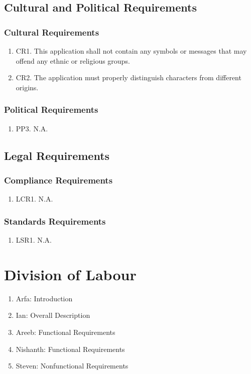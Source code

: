 \documentclass[]{article}
\begin{document}
\subsection{Cultural and Political Requirements}
\subsubsection{Cultural Requirements}
\begin{enumerate}
	\item CR1. This application shall not contain any symbols or messages that may offend any ethnic or religious groups.
	\item CR2. The application must properly distinguish characters from different origins.
\end{enumerate}

\subsubsection{Political Requirements}
\begin{enumerate}
	\item PP3. N.A.
\end{enumerate}

\subsection{Legal Requirements}
\subsubsection{Compliance Requirements}
\begin{enumerate}
	\item LCR1. N.A.
\end{enumerate}

\subsubsection{Standards Requirements}
\begin{enumerate}
	\item LSR1. N.A.
\end{enumerate}

\appendix
\section{Division of Labour}
\label{sec:division_of_labour}
\begin{enumerate}
	\item Arfa: Introduction
	\item Ian: Overall Description
	\item Areeb: Functional Requirements
	\item Nishanth: Functional Requirements
	\item Steven: Nonfunctional Requirements
\end{enumerate}
\end{document}
